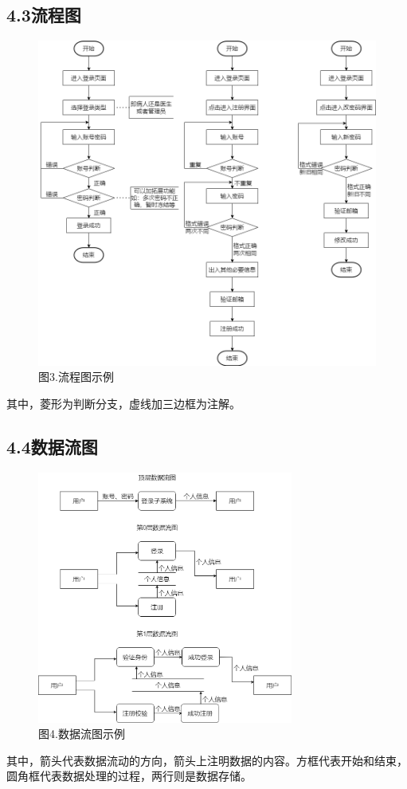 \documentclass[24pt,a4paper]{article}%
\begin{document}
\subsection*{\songti 4.3流程图}
\begin{figure}[H]
    \centering
    \includegraphics[width=1\textwidth]{images/流程图.png}
    \caption*{图3.流程图示例}
\end{figure}
其中，菱形为判断分支，虚线加三边框为注解。
\subsection*{\songti 4.4数据流图}
\begin{figure}[H]
    \centering
    \includegraphics[width=0.75\textwidth]{images/数据流图.png}
    \caption*{图4.数据流图示例}
\end{figure}
其中，箭头代表数据流动的方向，箭头上注明数据的内容。方框代表开始和结束，圆角框代表数据处理的过程，两行则是数据存储。
\end{document}
